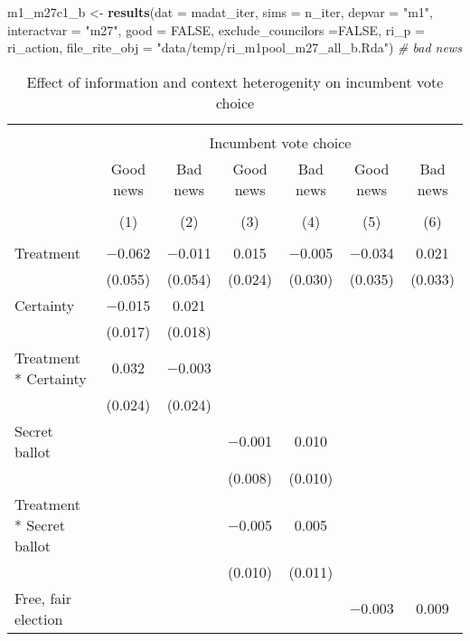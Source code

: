 \documentclass[]{article}
\newenvironment{Shaded}{\begin{snugshade}}{\end{snugshade}}
\newcommand{\KeywordTok}[1]{\textcolor[rgb]{0.13,0.29,0.53}{\textbf{#1}}}
\newcommand{\DataTypeTok}[1]{\textcolor[rgb]{0.13,0.29,0.53}{#1}}
\newcommand{\StringTok}[1]{\textcolor[rgb]{0.31,0.60,0.02}{#1}}
\newcommand{\CommentTok}[1]{\textcolor[rgb]{0.56,0.35,0.01}{\textit{#1}}}
\newcommand{\OtherTok}[1]{\textcolor[rgb]{0.56,0.35,0.01}{#1}}
\newcommand{\NormalTok}[1]{#1}
\begin{document}
\begin{Shaded}
\begin{Highlighting}[]
\NormalTok{m1_m27c1_b <-}\StringTok{ }\KeywordTok{results}\NormalTok{(}\DataTypeTok{dat =}\NormalTok{ madat_iter, }\DataTypeTok{sims =}\NormalTok{ n_iter, }
                      \DataTypeTok{depvar =} \StringTok{"m1"}\NormalTok{, }\DataTypeTok{interactvar =} \StringTok{"m27"}\NormalTok{, }\DataTypeTok{good =} \OtherTok{FALSE}\NormalTok{, }\DataTypeTok{exclude_councilors =}\OtherTok{FALSE}\NormalTok{,}
                      \DataTypeTok{ri_p =}\NormalTok{ ri_action, }\DataTypeTok{file_rite_obj =} \StringTok{"data/temp/ri_m1pool_m27_all_b.Rda"}\NormalTok{) }\CommentTok{# bad news}
\end{Highlighting}
\end{Shaded}

\begin{table}[!htbp] \centering 
  \caption{Effect of information and context heterogenity on incumbent vote choice} 
  \label{context_hetero} 
\begin{tabular}{@{\extracolsep{1pt}}lcccccc} 
\\[-1.8ex]\hline 
\hline \\[-1.8ex] 
 & \multicolumn{6}{c}{Incumbent vote choice} \\ 
\cline{2-7} 
 & Good news & Bad news & Good news & Bad news & Good news & Bad news \\ 
\cline{2-7}
\\[-1.8ex] & (1) & (2) & (3) & (4) & (5) & (6)\\ 
\hline \\[-1.8ex] 
 Treatment & $-$0.062 & $-$0.011 & 0.015 & $-$0.005 & $-$0.034 & 0.021 \\ 
  & (0.055) & (0.054) & (0.024) & (0.030) & (0.035) & (0.033) \\ 
  Certainty & $-$0.015 & 0.021 &  &  &  &  \\ 
  & (0.017) & (0.018) &  &  &  &  \\ 
  Treatment * Certainty & 0.032 & $-$0.003 &  &  &  &  \\ 
  & (0.024) & (0.024) &  &  &  &  \\ 
  Secret ballot &  &  & $-$0.001 & 0.010 &  &  \\ 
  &  &  & (0.008) & (0.010) &  &  \\ 
  Treatment * Secret ballot &  &  & $-$0.005 & 0.005 &  &  \\ 
  &  &  & (0.010) & (0.011) &  &  \\ 
  Free, fair election &  &  &  &  & $-$0.003 & 0.009 \\ 

\end{tabular}
\end{table}
\end{document}
